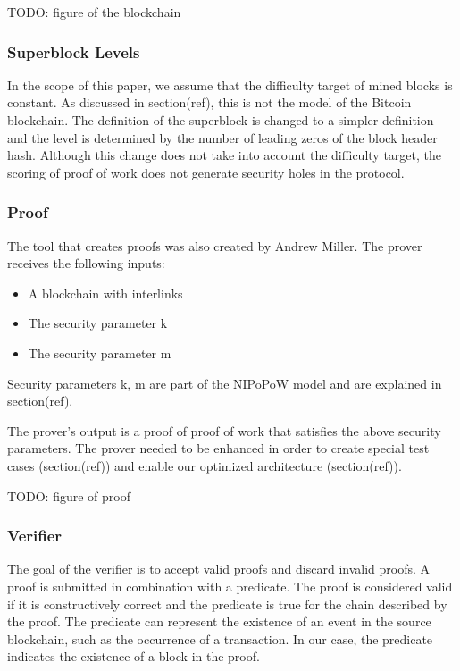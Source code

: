 \documentclass{article}
\begin{document}
  TODO: figure of the blockchain

  \subsubsection{Superblock Levels}

  In the scope of this paper, we assume that the difficulty target of
  mined blocks is constant. As discussed in section(ref), this is not
  the model of the Bitcoin blockchain. The definition of the superblock
  is changed to a simpler definition and the level is determined by the
  number of leading zeros of the block header hash. Although this change
  does not take into account the difficulty target, the scoring of proof
  of work does not generate security holes in the protocol.

  \subsubsection{Proof}

  The tool that creates proofs was also created by Andrew Miller. The
  prover receives the following inputs:

  \begin{itemize}
  \item
    A blockchain with interlinks
  \item
    The security parameter k
  \item
    The security parameter m
  \end{itemize}

  Security parameters k, m are part of the NIPoPoW model and are
  explained in section(ref).

  The prover’s output is a proof of proof of work that satisfies the
  above security parameters. The prover needed to be enhanced in order
  to create special test cases (section(ref)) and enable our optimized
  architecture (section(ref)).

  TODO: figure of proof

  \subsubsection{Verifier}

  The goal of the verifier is to accept valid proofs and discard invalid
  proofs. A proof is submitted in combination with a predicate. The
  proof is considered valid if it is constructively correct and the
  predicate is true for the chain described by the proof. The predicate
  can represent the existence of an event in the source blockchain, such
  as the occurrence of a transaction. In our case, the predicate
  indicates the existence of a block in the proof.
\end{document}
